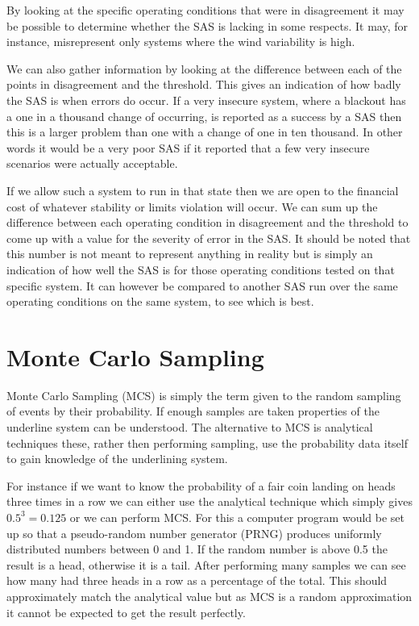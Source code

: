 \documentclass[a4paper,oneside,12pt]{report}
\begin{document}
By looking at the specific operating conditions that were in disagreement it may be possible to determine whether the SAS is lacking in some respects. It may, for instance, misrepresent only systems where the wind variability is high.

We can also gather information by looking at the difference between each of the points in disagreement and the threshold. This gives an indication of how badly the SAS is when errors do occur. If a very insecure system, where a blackout has a one in a thousand change of occurring, is reported as a success by a SAS then this is a larger problem than one with a change of one in ten thousand. In other words it would be a very poor SAS if it reported that a few very insecure scenarios were actually acceptable. 

If we allow such a system to run in that state then we are open to the financial cost of whatever stability or limits violation will occur. We can sum up the difference between each operating condition in disagreement and the threshold to come up with a value for the severity of error in the SAS. It should be noted that this number is not meant to represent anything in reality but is simply an indication of how well the SAS is for those operating conditions tested on that specific system. It can however be compared to another SAS run over the same operating conditions on the same system, to see which is best.

\section{Monte Carlo Sampling}\label{lbl_sec_mcs}

Monte Carlo Sampling (MCS) is simply the term given to the random sampling of events by their probability. If enough samples are taken properties of the underline system can be understood. The alternative to MCS is analytical techniques these, rather then performing sampling, use the probability data itself to gain knowledge of the underlining system.

For instance if we want to know the probability of a fair coin landing on heads three times in a row we can either use the analytical technique which simply gives $0.5^3 = 0.125$ or we can perform MCS. For this a computer program would be set up so that a pseudo-random number generator (PRNG) produces uniformly distributed numbers between 0 and 1. If the random number is above 0.5 the result is a head, otherwise it is a tail. After performing many samples we can see how many had three heads in a row as a percentage of the total. This should approximately match the analytical value but as MCS is a random approximation it cannot be expected to get the result perfectly.
\end{document}
